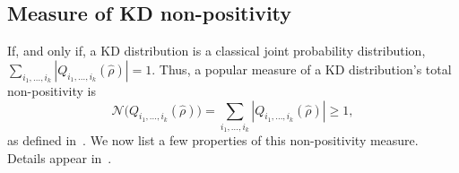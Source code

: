 \documentclass[%
 reprint,
superscriptaddress,
nofootinbib,
bibnotes,
 amsmath,amssymb,
 aps,
]{revtex4-1}
\theoremstyle{plain}
\newcommand{\LParen}{ \bm{(} }
\newcommand{\RParen}{ \bm{)} }
\begin{document}
\subsection{Measure of KD non-positivity}
\label{SubSec:KDNonclas}


If, and only if, a KD distribution is a classical joint probability distribution,   $\sum_{i_1,\ldots,i_k}  \left| Q_{i_1,\ldots,i_k} (\hat{\rho}) \right| =  1$. Thus, a popular measure  of a KD distribution's total non-positivity is
\begin{equation}
\label{Eq:TotNonPos}
\mathcal{N} \LParen Q_{i_1,\ldots,i_k} (\hat{\rho})  \RParen 
= \sum_{i_1,\ldots,i_k}  \left| Q_{i_1,\ldots,i_k} (\hat{\rho}) \right| \geq 1,
\end{equation}
as defined in~\cite{Alonso_OTOC_2019}.
We now list a few properties of this non-positivity measure. Details appear in~\cite{ArvidssonShukur2021}.
\end{document}
